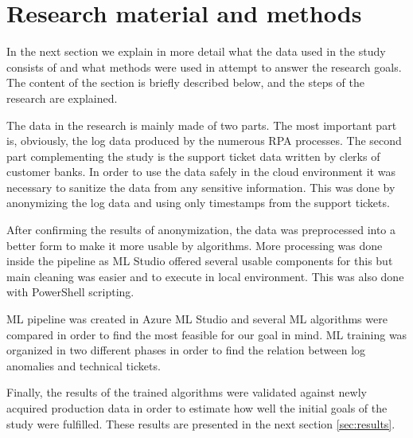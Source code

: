 

\section{Research material and methods}\label{sec:research-material-and-methods}

In the next section
we explain in more detail
what the data used in the study
consists of
and what methods were used
in attempt to answer the research goals.
The content of the section is briefly described below,
and the steps of the research are explained. %

The data in the research is mainly made of two parts.
The most important part is, obviously,
the log data produced by the numerous RPA processes.
The second part complementing the study
is the support ticket data written by clerks of customer banks.
In order to use the data safely in the cloud environment
it was necessary to sanitize the data
from any sensitive information.
This was done by anonymizing the log data
and using only timestamps from the support tickets.

After confirming the results of anonymization,
the data was preprocessed into a better form
to make it more usable by algorithms.
More processing was done inside the pipeline
as ML Studio offered several usable components for this
but main cleaning was easier and to execute in local environment.
This was also done with PowerShell scripting.

ML pipeline was created in Azure ML Studio
and several ML algorithms were compared
in order to find the most feasible for our goal in mind.
ML training was organized in two different phases
in order to find the relation between
log anomalies and technical tickets.

Finally,
the results of the trained algorithms
were validated against newly acquired production data
in order to estimate how well the initial goals of the study
were fulfilled.
These results are presented in the next section \ref{sec:results}.



